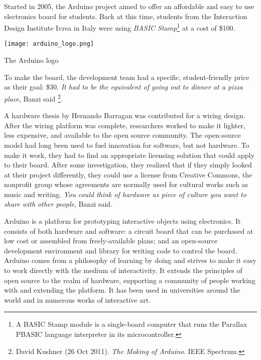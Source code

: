 Started in 2005, the Arduino project aimed to offer an affordable and easy to use electronics board for students. Back at this time, students from the Interaction Design Institute Ivrea in Italy were using \emph{BASIC Stamp}\footnote{A BASIC Stamp module is a single-board computer that runs the Parallax PBASIC language interpreter in its microcontroller.} at a cost of \$100.

\begin{NFfigure}
    \begin{center}
        \texttt{[image: arduino\_logo.png]}
    \caption{The Arduino logo}
    \label{fig:arduino_logo}
    \end{center}
\end{NFfigure}

To make the board, the development team had a specific, student-friendly price as their goal: \$30. \emph{It had to be the equivalent of going out to dinner at a pizza place}, Banzi said \footnote{David Kushner (26 Oct 2011). \emph{The Making of Arduino}. IEEE Spectrum.}.

A hardware thesis by Hernando Barragan\cite{barragan2004wiring} was contributed for a wiring design. After the wiring platform was complete, researchers worked to make it lighter, less expensive, and available to the open source community. The open-source model had long been used to fuel innovation for software, but not hardware. To make it work, they had to find an appropriate licensing solution that could apply to their board. After some investigation, they realized that if they simply looked at their project differently, they could use a license from Creative Commons, the nonprofit group whose agreements are normally used for cultural works such as music and writing. \emph{You could think of hardware as piece of culture you want to share with other people}, Banzi said.

Arduino is a platform for prototyping interactive objects using electronics. It consists of both hardware and software: a circuit board that can be purchased at low cost or assembled from freely-available plans; and an open-source development environment and library for writing code to control the board. Arduino comes from a philosophy of learning by doing and strives to make it easy to work directly with the medium of interactivity. It extends the principles of open source to the realm of hardware, supporting a community of people working with and extending the platform. It has been used in universities around the world and in numerous works of interactive art.\cite{mellis2007arduino}



